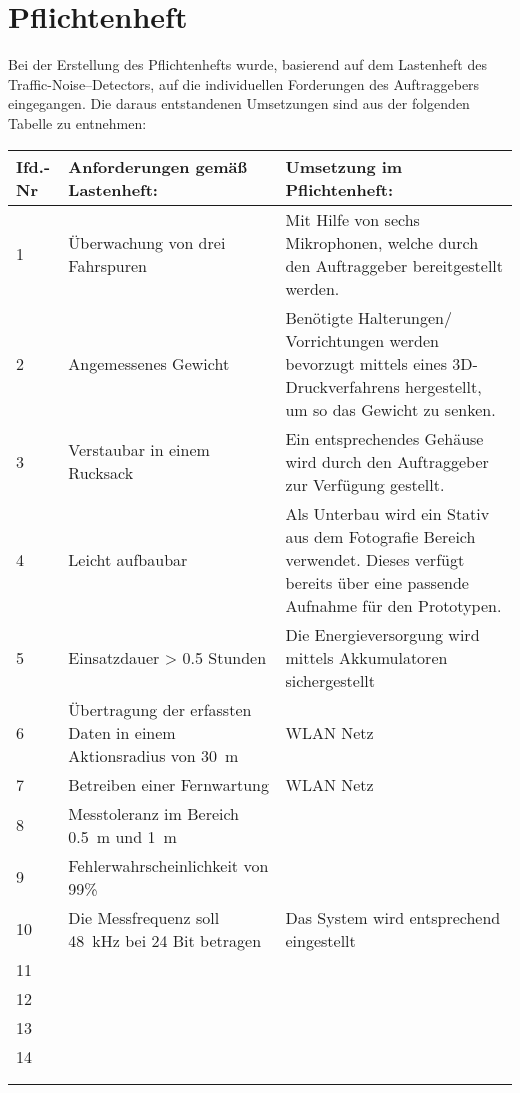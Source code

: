 \section{Pflichtenheft}

Bei der Erstellung des Pflichtenhefts wurde, basierend auf dem Lastenheft des Traffic-Noise--Detectors, auf die individuellen Forderungen des Auftraggebers eingegangen. Die daraus entstandenen Umsetzungen sind aus der folgenden Tabelle zu entnehmen:

\begin{center}
\begin{tabular}{|p{2cm}|p{6cm}|p{6cm}|}
\hline
\textbf{Ifd.-Nr} & \textbf{Anforderungen gemäß Lastenheft:} & \textbf{Umsetzung im Pflichtenheft:}\\
\hline
1 & Überwachung von drei Fahrspuren & Mit Hilfe von sechs Mikrophonen, welche durch den Auftraggeber bereitgestellt werden.\\
\hline
2 & Angemessenes Gewicht & Benötigte Halterungen/ Vorrichtungen werden bevorzugt mittels eines 3D-Druckverfahrens hergestellt, um so das Gewicht zu senken. \hfill\\
\hline
3 & Verstaubar in einem Rucksack & Ein entsprechendes Gehäuse wird durch den Auftraggeber zur Verfügung gestellt. \\
\hline
4 & Leicht aufbaubar & Als Unterbau wird ein Stativ aus dem Fotografie Bereich verwendet. Dieses verfügt bereits über eine passende Aufnahme für den Prototypen.\\
\hline
5 & Einsatzdauer > 0.5 Stunden & Die Energieversorgung wird mittels Akkumulatoren sichergestellt \\
\hline
6 & Übertragung der erfassten Daten in einem Aktionsradius von \SI{30}{m} & WLAN Netz \\
\hline
7 & Betreiben einer Fernwartung & WLAN Netz\\
\hline
8 & Messtoleranz im Bereich \SI{0,5}{m} und \SI{1}{m} & \\
\hline
9 & Fehlerwahrscheinlichkeit von 99\% & \\
\hline
10 & Die Messfrequenz soll \SI{48}{kHz} bei 24 Bit betragen \hfill & Das System wird entsprechend eingestellt \hfill \\
\hline
11 &&\\
\hline
12 &&\\
\hline
13 &&\\
\hline
14 &&\\
\hline
&&\\
\hline
&&\\
\hline
\end{tabular}
\end{center}